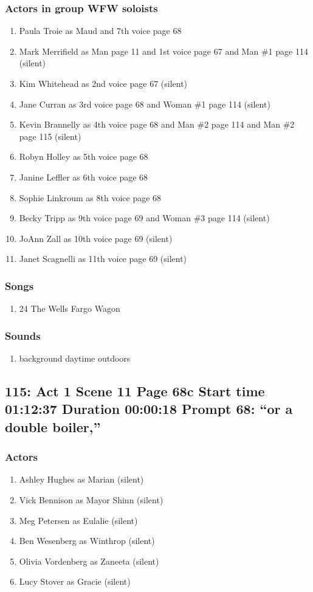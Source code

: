 \subsubsection{Actors in group WFW soloists}
\begin{enumerate}
\item Paula Troie as Maud and 7th voice page 68
\item Mark Merrifield as Man page 11 and 1st voice page 67 and Man \#1 page 114 (silent)
\item Kim Whitehead as 2nd voice page 67 (silent)
\item Jane Curran as 3rd voice page 68 and Woman \#1 page 114 (silent)
\item Kevin Brannelly as 4th voice page 68 and Man \#2 page 114 and Man \#2 page 115 (silent)
\item Robyn Holley as 5th voice page 68
\item Janine Leffler as 6th voice page 68
\item Sophie Linkroum as 8th voice page 68
\item Becky Tripp as 9th voice page 69 and Woman \#3 page 114 (silent)
\item JoAnn Zall as 10th voice page 69 (silent)
\item Janet Scagnelli as 11th voice page 69 (silent)
\end{enumerate}

\subsubsection{Songs}
\begin{enumerate}
\item 24 The Wells Fargo Wagon
\end{enumerate}\subsubsection{Sounds}
\begin{enumerate}
\item background daytime outdoors
\end{enumerate}
\subsection{115: Act 1 Scene 11 Page 68c Start time 01:12:37 Duration 00:00:18 Prompt 68: ``or a double boiler,''}

\subsubsection{Actors}
\begin{enumerate}
\item Ashley Hughes as Marian (silent)
\item Vick Bennison as Mayor Shinn (silent)
\item Meg Petersen as Eulalie (silent)
\item Ben Wesenberg as Winthrop (silent)
\item Olivia Vordenberg as Zaneeta (silent)
\item Lucy Stover as Gracie (silent)
\end{enumerate}
